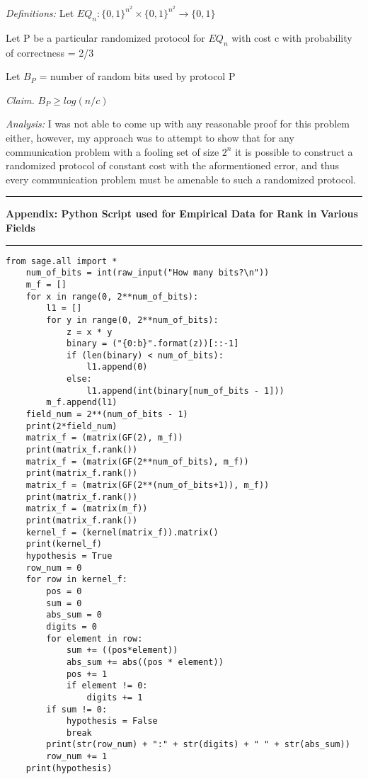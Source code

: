\documentclass[11pt]{article}
\newcommand\newAppendix[2]{\vspace{.25in}\hrule\textbf{#1 #2}\vspace{.5em}\hrule\vspace{.10in}}
\newcommand\analysis{\vspace{.10in}\emph{Analysis: }\newline}
\newcommand\definitions{\emph{Definitions:}\newline}
\newcommand\claim{\emph{Claim.}\newline}
\begin{document}
\definitions
Let $EQ_n: {\{0, 1\}}^{n^2} \times {\{0, 1\}}^{n^2} \to \{0, 1\}$

Let P be a particular randomized protocol for $EQ_n$ with cost c with probability of correctness = 2/3

Let $B_P$ = number of random bits used by protocol P 

\claim
$B_{P} \geq log(n/c)$

\analysis
I was not able to come up with any reasonable proof for this problem either, however, my approach was to attempt to show that for any communication problem with a fooling set of size $2^n$ it is possible to construct a randomized protocol of constant cost with the aformentioned error, and thus every communication problem must be amenable to such a randomized protocol. 

\newpage
\newAppendix{Appendix:}{Python Script used for Empirical Data for Rank in Various Fields}
\begin{lstlisting}
from sage.all import *
    num_of_bits = int(raw_input("How many bits?\n"))
    m_f = []
    for x in range(0, 2**num_of_bits):
        l1 = []
        for y in range(0, 2**num_of_bits):
            z = x * y
            binary = ("{0:b}".format(z))[::-1]
            if (len(binary) < num_of_bits):
                l1.append(0)
            else:
                l1.append(int(binary[num_of_bits - 1]))
        m_f.append(l1)
    field_num = 2**(num_of_bits - 1)
    print(2*field_num)
    matrix_f = (matrix(GF(2), m_f))
    print(matrix_f.rank())
    matrix_f = (matrix(GF(2**num_of_bits), m_f))
    print(matrix_f.rank()) 
    matrix_f = (matrix(GF(2**(num_of_bits+1)), m_f))
    print(matrix_f.rank())
    matrix_f = (matrix(m_f))
    print(matrix_f.rank())
    kernel_f = (kernel(matrix_f)).matrix()
    print(kernel_f)
    hypothesis = True
    row_num = 0
    for row in kernel_f:
        pos = 0
        sum = 0
        abs_sum = 0
        digits = 0
        for element in row:
            sum += ((pos*element))
            abs_sum += abs((pos * element))
            pos += 1
            if element != 0:
                digits += 1
        if sum != 0:
            hypothesis = False
            break
        print(str(row_num) + ":" + str(digits) + " " + str(abs_sum))
        row_num += 1
    print(hypothesis) 
       
\end{lstlisting}
\end{document}
